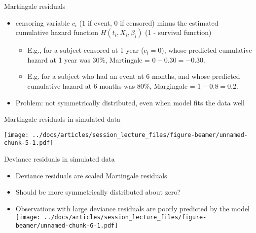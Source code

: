 \documentclass[
  ignorenonframetext,
]{beamer}
\providecommand{\tightlist}{%
  \setlength{\itemsep}{0pt}\setlength{\parskip}{0pt}}
\begin{document}
\begin{frame}{Martingale residuals}
\protect\hypertarget{martingale-residuals}{}

\begin{itemize}
\tightlist
\item
  censoring variable \(c_i\) (1 if event, 0 if censored) minus the
  estimated cumulative hazard function \(H(t_i, X_i, \beta_i)\) (1 -
  survival function)

  \begin{itemize}
  \tightlist
  \item
    E.g., for a subject censored at 1 year (\(c_i=0\)), whose predicted
    cumulative hazard at 1 year was 30\%, Martingale =
    \(0 - 0.30 = -0.30\).
  \item
    E.g. for a subject who had an event at 6 months, and whose predicted
    cumulative hazard at 6 months was 80\%, Margingale =
    \(1 - 0.8 = 0.2\).
  \end{itemize}
\item
  Problem: not symmetrically distributed, even when model fits the data
  well
\end{itemize}

\end{frame}

\begin{frame}{Martingale residuals in simulated data}
\protect\hypertarget{martingale-residuals-in-simulated-data}{}

\texttt{[image: ../docs/articles/session\_lecture\_files/figure-beamer/unnamed-chunk-5-1.pdf]}

\end{frame}

\begin{frame}{Deviance residuals in simulated data}
\protect\hypertarget{deviance-residuals-in-simulated-data}{}

\begin{itemize}
\tightlist
\item
  Deviance residuals are scaled Martingale residuals
\item
  Should be more symmetrically distributed about zero?
\item
  Observations with large deviance residuals are poorly predicted by the
  model
  \texttt{[image: ../docs/articles/session\_lecture\_files/figure-beamer/unnamed-chunk-6-1.pdf]}
\end{itemize}

\end{frame}
\end{document}
